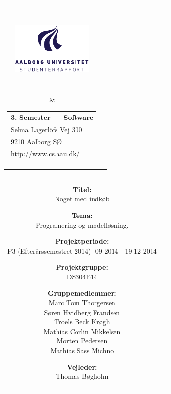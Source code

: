\thispagestyle{empty}
\enlargethispage*{\ifcounts 4\else 2\fi\baselineskip}
{\samepage
\begin{tabular}{cc}
  \parbox{0.5\textwidth}{ %
    \hspace*{1cm} %
    \includegraphics[width=4cm,height=4cm,keepaspectratio]{images/aau_logo_da.pdf}} &
  \parbox{0.5\textwidth}{\begin{tabular}{l}
      {\small \textbf{3. Semester --- Software}}\\
      {\small Selma Lagerlöfs Vej 300} \\
      {\small 9210 Aalborg SØ} \\
      {\small http://www.cs.aau.dk/}
    \end{tabular}}
\end{tabular}

\begin{tabular}{cc}
  \parbox{8cm}{
  \begin{description}
    \item { \textbf{Titel:}}\\ 
      Noget med indkøb
    \item { \textbf{Tema:}}\\ 
      Programering og modelløsning. 
  \end{description}
  
  \parbox{8cm}{
  \begin{description}
    \item { \textbf{Projektperiode:}}\\
      P3 (Efterårssemestret 2014) -09-2014 - 19-12-2014
    \hspace{4cm}
    \item { \textbf{Projektgruppe:}}\\
        DS304E14
    \hspace{4cm}
    \item {\textbf{Gruppemedlemmer:}}\\
      Marc Tom Thorgersen\\
      Søren Hvidberg Frandsen\\
      Troels Beck Krøgh\\
      Mathias Corlin Mikkelsen\\
      Morten Pedersen\\
      Mathias Sass Michno\\
    \hspace{2cm}
    \item { \textbf{Vejleder:}}\\
      Thomas Bøgholm\\
    \end{description}
  }

}
\end{tabular}}
